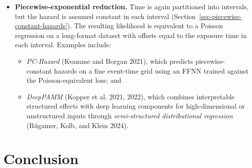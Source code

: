 \documentclass[
  letterpaper,
  krantz2]{style/krantz}
\providecommand{\tightlist}{%
  \setlength{\itemsep}{0pt}\setlength{\parskip}{0pt}}
\begin{document}
\begin{itemize}
  \begin{itemize}
  \tightlist
  \item
    \emph{PLANN} (Biganzoli et al. 1998), which uses a
    single-hidden-layer FFNN on the long-format
    dataset;
  \item
    \emph{Nnet-survival} (Michael F. Gensheimer and Narasimhan 2019b),
    which predicts discrete hazards using a deep
    network;
  \item
    \emph{N-MTLR} (Fotso 2018), which adapts multi-task logistic
    regression to
    survival; and
  \item
    \emph{DeepHit} (C. Lee et al. 2018), which jointly models \(Q\)
    competing risks through a softmax over \((J \times (Q{+}1))\)
    cells.
  \end{itemize}
\item
  \textbf{Piecewise-exponential reduction.} Time is again partitioned
  into intervals, but the hazard is assumed constant in each
  interval
  (Section~\ref{sec-piecewise-constant-hazards}). The resulting
  likelihood is equivalent to a Poisson
  regression on a long-format dataset with
  offsets equal to the exposure time in each interval. Examples include:

  \begin{itemize}
  \tightlist
  \item
    \emph{PC-Hazard} (Kvamme and Borgan 2021), which predicts
    piecewise-constant hazards on a fine event-time grid using an FFNN
    trained against the Poisson-equivalent loss;
    and
  \item
    \emph{DeepPAMM} (Kopper et al. 2021, 2022), which combines
    interpretable structured effects with deep learning components for
    high-dimensional or unstructured inputs through
    \emph{semi-structured distributional regression} (Rügamer, Kolb, and
    Klein 2024).
  \end{itemize}
\end{itemize}

\section{Conclusion}\label{conclusion-12}
\end{document}

